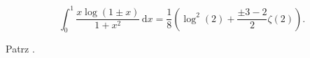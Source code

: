 %

\begin{problem_with_solution}
    \label{valean_1_13}%
    \begin{equation}
        \int_0^1 \frac{x \log (1 \pm x)}{1 + x^2} \, \mathrm{d} x = \frac 1 8 \left(\log^2 (2) + \frac{\pm 3 - 2}{2} \zeta(2)\right).
    \end{equation} 
\end{problem_with_solution}


\begin{solution}
    Patrz \cite[s. 8]{valean19}.
\end{solution}


%